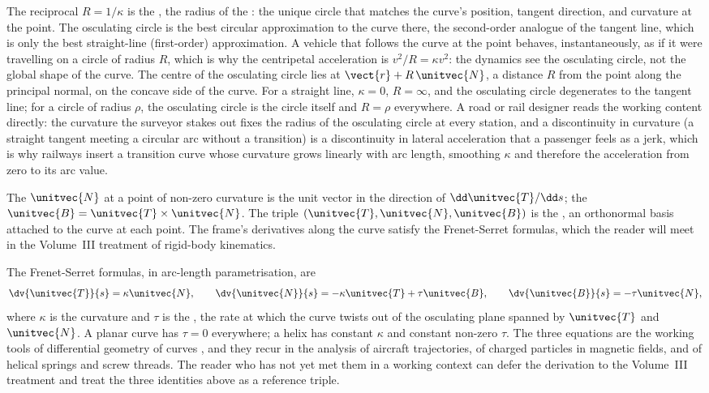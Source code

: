 The reciprocal $R = 1/\kappa$ is the ,
the radius of the : the unique circle that
matches the curve's position, tangent direction, and curvature at the
point. The osculating circle is the best circular approximation to the
curve there, the second-order analogue of the tangent line, which is
only the best straight-line (first-order) approximation. A vehicle that
follows the curve at the point behaves, instantaneously, as if it were
travelling on a circle of radius $R$, which is why the centripetal
acceleration is $v^{2}/R = \kappa v^{2}$: the dynamics see the
osculating circle, not the global shape of the curve. The centre of the
osculating circle lies at $\vect{r} + R\,\unitvec{N}$, a distance $R$
from the point along the principal normal, on the concave side of the
curve. For a straight line, $\kappa = 0$, $R = \infty$, and the
osculating circle degenerates to the tangent line; for a circle of
radius $\rho$, the osculating circle is the circle itself and
$R = \rho$ everywhere. A road or rail designer reads the working
content directly: the curvature the surveyor stakes out fixes the
radius of the osculating circle at every station, and a discontinuity
in curvature (a straight tangent meeting a circular arc without a
transition) is a discontinuity in lateral acceleration that a passenger
feels as a jerk, which is why railways insert a 
transition curve whose curvature grows linearly with arc length,
smoothing $\kappa$ and therefore the acceleration from zero to its
arc value.

The  $\unitvec{N}$ at a point of non-zero
curvature is the unit vector in the direction of $\dd\unitvec{T}/
\dd s$; the  $\unitvec{B} = \unitvec{T} \times
\unitvec{N}$. The triple $(\unitvec{T}, \unitvec{N}, \unitvec{B})$
is the , an orthonormal basis attached
to the curve at each point. The frame's derivatives along the curve
satisfy the Frenet-Serret formulas, which the reader will meet in
the Volume~III treatment of rigid-body kinematics.

\begin{mastery}
The Frenet-Serret formulas, in arc-length parametrisation, are
\[
\dv{\unitvec{T}}{s} = \kappa \unitvec{N}, \qquad
\dv{\unitvec{N}}{s} = -\kappa\unitvec{T} + \tau\unitvec{B}, \qquad
\dv{\unitvec{B}}{s} = -\tau\unitvec{N},
\]
where $\kappa$ is the curvature and $\tau$ is the
, the rate at which the curve twists out of the
osculating plane spanned by $\unitvec{T}$ and $\unitvec{N}$. A planar
curve has $\tau = 0$ everywhere; a helix has constant $\kappa$ and
constant non-zero $\tau$. The three equations are the working tools
of differential geometry of curves \cite{text:v2ch08-do-carmo-1976},
and they recur in the analysis of aircraft trajectories, of charged
particles in magnetic fields, and of helical springs and screw
threads. The reader who has not yet met them in a working context can
defer the derivation to the Volume~III treatment and treat the three
identities above as a reference triple.
\end{mastery}


